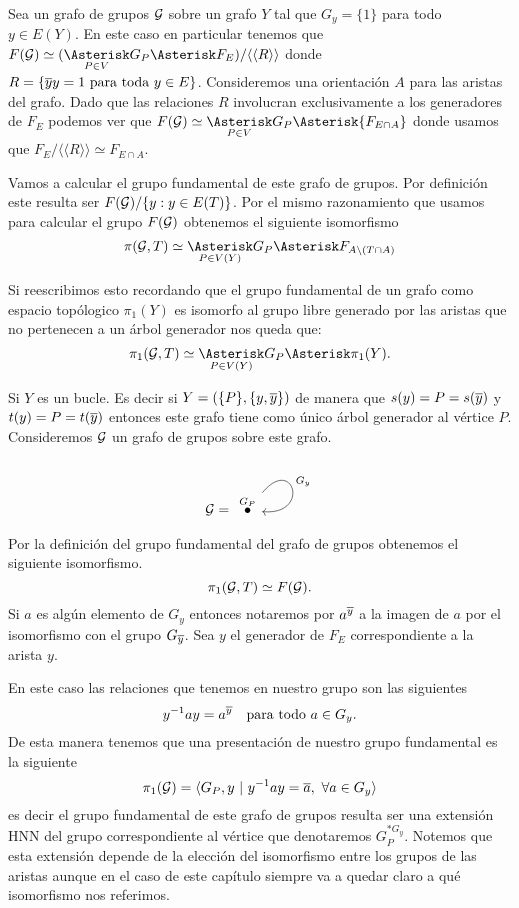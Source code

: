 \documentclass[tesis.tex]{subfiles}
\begin{document}
\begin{ej}
	Sea un grafo de grupos $\cal G$ sobre un grafo $Y$ tal que $G_y = \{ 1 \}$ para todo $y \in E(Y)$.
	En este caso en particular tenemos que 	$F(\cG) \simeq (\underset{P \in V}{\Asterisk} G_P \Asterisk F_{E}) / \langle \langle  R \rangle \rangle$
	donde $R = \{ \overline{y}y = 1 \ \text{para toda} \ y \in E \}$.
	Consideremos una orientación $A$ para las aristas del grafo.
	Dado que las relaciones $R$ involucran exclusivamente a los generadores de $F_{E}$ podemos ver que $F(\cG) \simeq \underset{P \in V}{\Asterisk} G_P \Asterisk {F_{E \cap A}}$ donde usamos que $F_{E}/\langle \langle  R \rangle \rangle \simeq F_{E \cap A}$.
	
	Vamos a calcular el grupo fundamental de este grafo de grupos.
	Por definición este resulta ser $F({\cal G}) / \{  y : y \in E(T) \}$.
	Por el mismo razonamiento que usamos para calcular el grupo $F({\cal G})$ obtenemos el siguiente isomorfismo
	\[
		\pi({\cal G}, T) \simeq \underset{P \in V(Y)}{\Asterisk} G_P \Asterisk F_{A \setminus (T \cap A)}
	\]
	
	Si reescribimos esto recordando que el grupo fundamental de un grafo como espacio topólogico $\pi_1(Y)$ es isomorfo al grupo libre generado por las aristas que no pertenecen a un árbol generador nos queda que: 
	\[
		\pi_1({\cal G}, T) \simeq \underset{P \in V(Y)}{\Asterisk} G_P  \Asterisk \pi_1(Y). 
	\]
\end{ej}

\begin{ej}\label{ej_pi1_bucle}
	Si $Y$ es un bucle. 
	Es decir si $Y = (\{P\}, \{y,\overline y \})$ de manera que $s(y)=P=s(\overline y)$ y $t(y) = P = t(\overline y)$ entonces este grafo tiene como único árbol generador al vértice $P$.
	Consideremos ${\cal G}$ un grafo de grupos sobre este grafo.
	\[
	\cG = 	\begin{tikzcd}
		\overset{G_P}{\bullet} \arrow["G_y", loop, distance=3.5em, in=355, out=50]
	\end{tikzcd}
	\]
	
	Por la definición del grupo fundamental del grafo de grupos obtenemos el siguiente isomorfismo. 
	\[
		\pi_1({\cal G},T) \simeq F({\cal G}).
	\]
	Si $a$ es algún elemento de $G_y$ entonces notaremos por $a^{\overline y}$ a la imagen de $a$ por el isomorfismo con el grupo $G_{\overline y}$.
	Sea $y$ el generador de $F_{E}$ correspondiente a la arista $y$.
		 
	En este caso las relaciones que tenemos en nuestro grupo son las siguientes
	\[
	y^{-1}ay = a^{\ol y}  \  \ \ \text{para todo} \ a \in G_y.
	\]   
	De esta manera tenemos que una presentación de nuestro grupo fundamental es la siguiente
	\[
	\pi_1({\cal G}) = \langle G_P, y \ | \ y^{-1}ay = \overline{a}, \ \forall a \in G_y \rangle
	\]
	es decir el grupo fundamental de este grafo de grupos resulta ser una extensión HNN del grupo correspondiente al vértice que denotaremos $G_P^{\ast G_y}$.
	Notemos que esta extensión depende de la elección del isomorfismo entre los grupos de las aristas aunque en el caso de este capítulo siempre va a quedar claro a qué isomorfismo nos referimos.
	
\end{ej}
\end{document}
